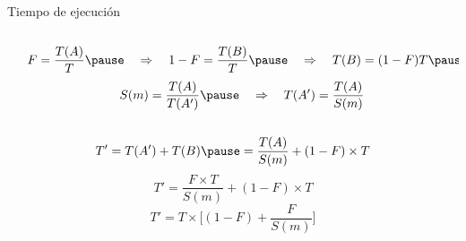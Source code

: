 \begin{frame}[t]{Tiempo de ejecución}
\begin{columns}
\begin{column}{0.4\textwidth}
\end{column}
\pause
\begin{column}{.6\textwidth}
\begin{small}
\begin{displaymath}
F=\frac{T(A)}{T} \pause
\quad \Rightarrow \quad 1 - F = \frac{T(B)}{T} \pause
\quad \Rightarrow \quad T(B) = (1 - F) T \pause
\end{displaymath}
\pause
\begin{displaymath}
S(m)=\frac{T(A)}{T(A')} \pause
\quad \Rightarrow \quad T(A') = \frac{T(A)}{S(m)}
\end{displaymath}
\end{small}
\end{column}
\end{columns}
\pause
\begin{small}
\begin{displaymath}
T'=T(A')+T(B) \pause =
\frac{T(A)}{S(m)}+(1-F) \times T
\end{displaymath}
\pause
\begin{displaymath}
T'=\frac{F \times T}{S(m)} + (1-F) \times T
\end{displaymath}
\pause
\begin{displaymath}
T'=T \times \Big[ (1 - F) + \frac{F}{S(m)} \Big]
\end{displaymath}
\end{small}
\end{frame}

